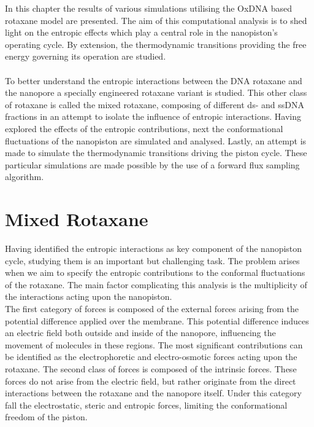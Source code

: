 \vspace{2cm}
\noindent In this chapter the results of various simulations utilising the OxDNA based
rotaxane model are presented. The aim of this computational analysis is to shed light on
the entropic effects which play a central role in the nanopiston's operating cycle. By
extension, the thermodynamic transitions providing the free energy governing its
operation are studied.\\\\
To better understand the entropic interactions between the DNA rotaxane and the nanopore
a specially engineered rotaxane variant is studied. This other class of rotaxane is
called the mixed rotaxane, composing of different ds- and ssDNA fractions in an attempt
to isolate the influence of entropic interactions. Having explored the effects of the
entropic contributions, next the conformational fluctuations of the nanopiston are
simulated and analysed. Lastly, an attempt is made to simulate the thermodynamic
transitions driving the piston cycle. These particular simulations are made possible
by the use of a forward flux sampling algorithm.

\newpage

\section{Mixed Rotaxane}

Having identified the entropic interactions as key component of the nanopiston cycle,
studying them is an important but challenging task. The problem arises when we aim to
specify the entropic contributions to the conformal fluctuations of the rotaxane. The
main factor complicating this analysis is the multiplicity of the interactions acting
upon the nanopiston.\\


The first category of forces is composed of the external forces arising from the
potential difference applied over the membrane. This potential difference induces an
electric field both outside and inside of the nanopore, influencing the movement of
molecules in these regions. The most significant contributions can be identified as the
electrophoretic and electro-osmotic forces acting upon the rotaxane. The second class of
forces is composed of the intrinsic forces. These forces do not arise from the
electric field, but rather originate from the direct interactions between the rotaxane
and the nanopore itself. Under this category fall the electrostatic, steric and entropic
forces, limiting the conformational freedom of the piston.



